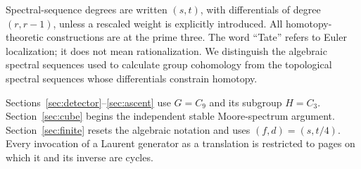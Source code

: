 Spectral-sequence degrees are written $(s,t)$, with differentials of degree $(r,r-1)$, unless a rescaled weight is explicitly introduced. All homotopy-theoretic constructions are at the prime three. The word ``Tate'' refers to Euler localization; it does not mean rationalization. We distinguish the algebraic spectral sequences used to calculate group cohomology from the topological spectral sequences whose differentials constrain homotopy.

Sections~\ref{sec:detector}--\ref{sec:ascent} use $G=C_9$ and its subgroup $H=C_3$. Section~\ref{sec:cube} begins the independent stable Moore-spectrum argument. Section~\ref{sec:finite} resets the algebraic notation and uses $(f,d)=(s,t/4)$. Every invocation of a Laurent generator as a translation is restricted to pages on which it and its inverse are cycles.

